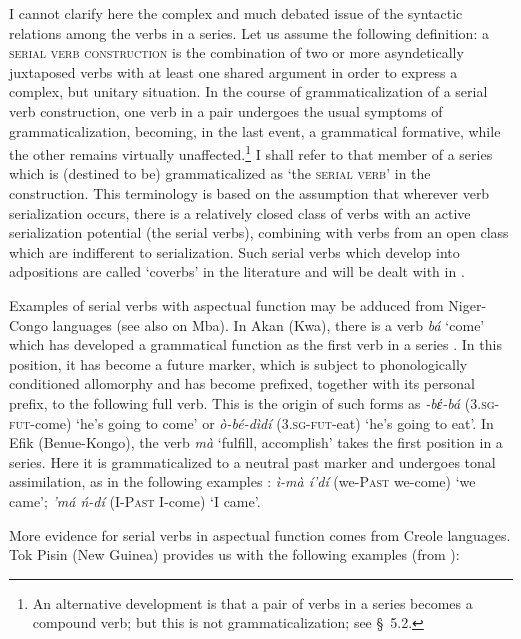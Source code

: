 \label{page37}I cannot clarify here the complex and much debated issue of the syntactic relations among the verbs in a series. Let us assume the following definition: a \textsc{serial verb construction} is the combination of two or more asyndetically juxtaposed verbs with at least one shared argument in order to express a complex, but unitary situation. In the course of grammaticalization of a serial verb construction, one verb in a pair undergoes the usual symptoms of grammaticalization, becoming, in the last event, a grammatical formative, while the other remains virtually unaffected.\footnote{An alternative development is that a pair of verbs in a series becomes a compound verb; but this is not grammaticalization; see §~5.2.} I shall refer to that member of a series which is (destined to be) grammaticalized as ‘the \textsc{serial verb}’ in the construction. This terminology is based on the assumption that wherever verb serialization occurs, there is a relatively closed class of verbs with an active serialization potential (the serial verbs), combining with verbs from an open class which are indifferent to serialization. Such serial verbs which develop into adpositions are called ‘coverbs’ in the literature and will be dealt with in .

Examples of serial verbs with aspectual function may be adduced from Niger-Congo languages (see also \citealt[113--117]{Sasse1977a} on Mba). In Akan (Kwa), there is a verb \textit{bá} ‘come’ which has developed a grammatical function as the first verb in a series \citep[353f]{Welmers1973}. In this position, it has become a future marker, which is subject to phonologically conditioned allomorphy and has become prefixed, together with its personal prefix, to the following full verb. This is the origin of such forms as \textit{{}-bέ-bá} (3.\textsc{sg-fut}{}-come) ‘he's going to come’ or \textit{ò-bé-dìdí} (3.\textsc{sg-fut}{}-eat) ‘he's going to eat’. In Efik (Benue-Kongo), the verb \textit{mà} ‘fulfill, accomplish’ takes the first position in a series. Here it is grammaticalized to a neutral past marker and undergoes tonal assimilation, as in the following examples \citep[371]{Welmers1973}: \textit{ì-mà í'dí }(we-\textsc{Past} we-come) ‘we came’; \textit{'má ń-dí} (I-\textsc{Past} I-come) ‘I came’.

More evidence for serial verbs in aspectual function comes from Creole languages. Tok Pisin (New Guinea) provides us with the following examples (from \citealt{Mosel1980}):

